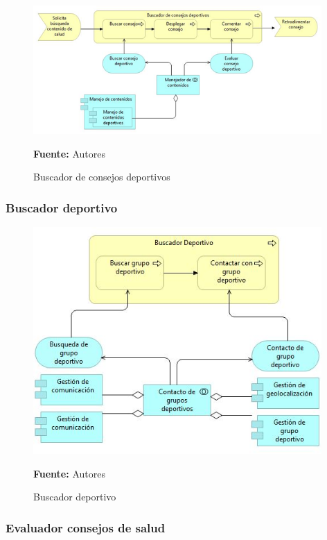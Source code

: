 \begin{figure}[!htb]
  \begin{center}
    \includegraphics[width=11cm]{./imagenes/Archimate/vistas/application_usage/buscadorconsejosdeportivos.png}
    \caption{Buscador de consejos deportivos}
    \label{fig:BP_BuscadorConsejosDeportivos}
    \textbf{Fuente:}  Autores
  \end{center}
\end{figure}

\subsubsection{Buscador deportivo}

\begin{figure}[!htb]
  \begin{center}
    \includegraphics[width=11cm]{./imagenes/Archimate/vistas/application_usage/buscadordeportivo.png}
    \caption{Buscador deportivo}
    \label{fig:BP_BuscadorDeportivo}
    \textbf{Fuente:}  Autores
  \end{center}
\end{figure}

\subsubsection{Evaluador consejos de salud}

